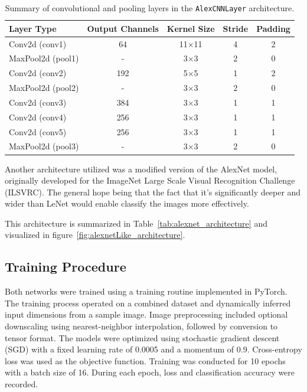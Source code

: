 \documentclass{pracalicmgr}
\begin{document}
\begin{table}[H]
\centering
\caption{Summary of convolutional and pooling layers in the \texttt{AlexCNNLayer} architecture.}
\begin{tabular}{|l|c|c|c|c|}
\hline
\textbf{Layer Type} & \textbf{Output Channels} & \textbf{Kernel Size} & \textbf{Stride} & \textbf{Padding} \\
\hline
Conv2d (conv1) & 64 & 11×11 & 4 & 2 \\
MaxPool2d (pool1) & - & 3×3 & 2 & 0 \\
Conv2d (conv2) & 192 & 5×5 & 1 & 2 \\
MaxPool2d (pool2) & - & 3×3 & 2 & 0 \\
Conv2d (conv3) & 384 & 3×3 & 1 & 1 \\
Conv2d (conv4) & 256 & 3×3 & 1 & 1 \\
Conv2d (conv5) & 256 & 3×3 & 1 & 1 \\
MaxPool2d (pool3) & - & 3×3 & 2 & 0 \\
\hline
\end{tabular}
\label{tab:alexcnn_layers}
\end{table}


Another architecture utilized was a modified version of the AlexNet model, originally developed for the ImageNet Large Scale Visual Recognition Challenge (ILSVRC). The general hope being that the fact that it's significantly deeper and wider than LeNet would enable classify the images more effectively.

This architecture is summarized in Table~\ref{tab:alexnet_architecture} and visualized in figure~\ref{fig:alexnetLike_architecture}.

\subsection{Training Procedure}

Both networks were trained using a training routine implemented in PyTorch. The training process operated on a combined dataset and dynamically inferred input dimensions from a sample image. Image preprocessing included optional downscaling using nearest-neighbor interpolation, followed by conversion to tensor format. The models were optimized using stochastic gradient descent (SGD) with a fixed learning rate of 0.0005 and a momentum of 0.9. Cross-entropy loss was used as the objective function. Training was conducted for 10 epochs with a batch size of 16. During each epoch, loss and classification accuracy were recorded.
\end{document}
